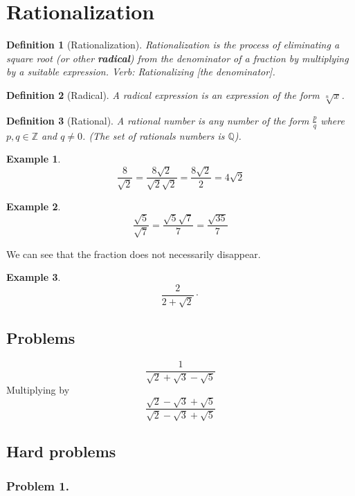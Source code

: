 \documentclass{article}
\newtheorem{definition}{Definition}
\newtheorem{example}{Example}
\begin{document}

\section{Rationalization}
\begin{definition}[Rationalization]
    Rationalization is the process of eliminating a square root (or other \textbf{radical}) from the denominator of a fraction by multiplying by a suitable expression. Verb: Rationalizing [the denominator].
\end{definition}

\begin{definition}[Radical]
    A radical expression is an expression of the form $\sqrt[n]{x}$.
\end{definition}

\begin{definition}[Rational]
    A rational number is any number of the form $\frac{p}{q}$ where
$p,q\in\mathbb{Z}$ and $q\ne0$. (The set of rationals numbers is $\mathbb{Q}$).
\end{definition}

\begin{example}
    \[
    \frac{8}{\sqrt{2}} = \frac{8\sqrt{2}}{\sqrt{2}\sqrt{2}} = \frac{8\sqrt{2}}{2} = 4\sqrt{2}
    \]
\end{example}
\begin{example}
    \[
    \frac{\sqrt{5}}{\sqrt{7}}
    = \frac{\sqrt{5}\sqrt{7}}{7}
    = \frac{\sqrt{35}}{7}
    \]
\end{example}
We can see that the fraction does not necessarily disappear.
\begin{example}
    \[
    \frac{2}{2 + \sqrt{2}} \cdot 
    \]
\end{example}

\subsection{Problems}
\[
\frac{1}{\sqrt{2} + \sqrt{3} - \sqrt{5}}
\]
Multiplying by
\[
\frac{\sqrt{2} - \sqrt{3} + \sqrt{5}}{\sqrt{2} - \sqrt{3} + \sqrt{5}}
\]

\subsection{Hard problems}
\subsubsection{Problem 1.}
\end{document}
